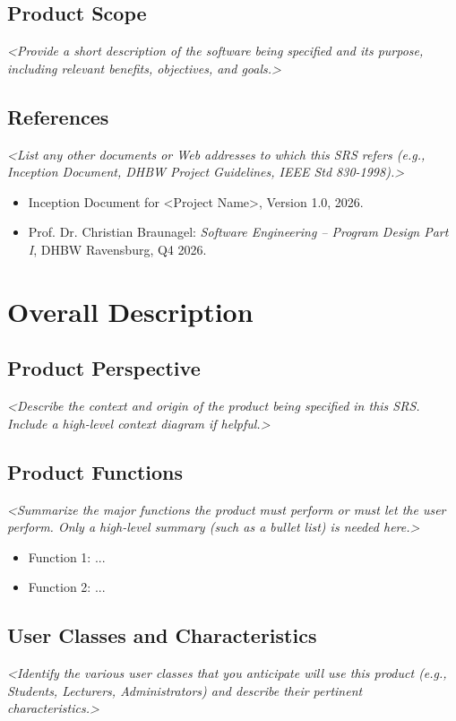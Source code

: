 \documentclass[11pt, a4paper]{article}
\newcommand{\projecttitle}{<Project Name>}
\newcommand{\guidance}[1]{\textit{\color{darkgray}<#1>}}
\begin{document}
\subsection{Product Scope}
\guidance{Provide a short description of the software being specified and its purpose, including relevant benefits, objectives, and goals.}

\subsection{References}
\guidance{List any other documents or Web addresses to which this SRS refers (e.g., Inception Document, DHBW Project Guidelines, IEEE Std 830-1998).}
\begin{itemize}
    \item Inception Document for \projecttitle, Version 1.0, 2026.
    \item Prof. Dr. Christian Braunagel: \textit{Software Engineering -- Program Design Part I}, DHBW Ravensburg, Q4 2026.
\end{itemize}

\section{Overall Description}

\subsection{Product Perspective}
\guidance{Describe the context and origin of the product being specified in this SRS. Include a high-level context diagram if helpful.}

\subsection{Product Functions}
\guidance{Summarize the major functions the product must perform or must let the user perform. Only a high-level summary (such as a bullet list) is needed here.}
\begin{itemize}
    \item Function 1: ...
    \item Function 2: ...
\end{itemize}

\subsection{User Classes and Characteristics}
\guidance{Identify the various user classes that you anticipate will use this product (e.g., Students, Lecturers, Administrators) and describe their pertinent characteristics.}
\end{document}
